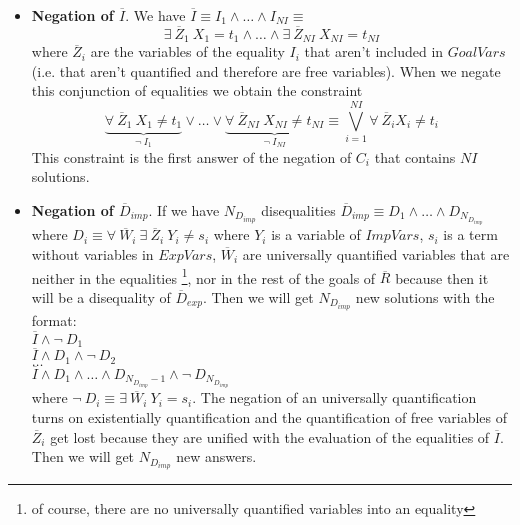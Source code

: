 \documentclass{llncs}
\begin{document}
        \begin{itemize}

           \item {\bf Negation of $\overline{I}$}. We have $\overline{I}
           \equiv I_1 \wedge \ldots \wedge I_{NI} \equiv$ \[ \exists~
           \overline{Z}_1~ X_1 = t_1 \wedge \ldots \wedge \exists~
           \overline{Z}_{NI}~ X_{NI} = t_{NI} \] where
           $\overline{Z}_i$ are the variables of the equality $I_i$ that
           aren't included in $GoalVars$ (i.e. that aren't quantified
           and therefore are free variables). When we negate this
           conjunction of equalities we obtain the constraint 
                \[
           \underbrace{\forall~ \overline{Z}_1~ X_1 \neq t_1} _{\neg~
           I_1} \vee \ldots \vee \underbrace{\forall~
           \overline{Z}_{NI}~ X_{NI} \neq t_{NI} } _{\neg~ I_{NI}}
           \equiv %
           \bigvee_{i=1}^{NI} \forall~ \overline{Z}_i X_i
           \neq t_i \] 
           This constraint is the first answer of the
           negation of $C_i$ that contains $NI$ solutions.

           \item {\bf Negation of $\overline{D}_{imp}$}. If we have
           $N_{D_{imp}}$ disequalities $\overline{D}_{imp} \equiv D_1
           \wedge \ldots \wedge D_{N_{D_{imp}}}$ where $ D_i \equiv
           \forall~ \overline{W}_i ~ \exists~ \overline{Z}_i ~ Y_i
           \neq s_i$ where $Y_i$ is a variable of $ImpVars$, $s_i$ is
           a term without variables in $ExpVars$, $\overline{W}_i$ are
           universally quantified variables that are neither in the
           equalities \footnote{of course, there are no universally
           quantified variables into an equality}, nor in the rest of
           the goals of $\overline{R}$ because then it will be a
           disequality of $\overline{D}_{exp}$. Then we will get
           $N_{D_{imp}}$ new solutions with the format: \\

           $\overline{I} \wedge \neg~ D_1 $ \\ 
           $\overline{I} \wedge
           D_1 \wedge \neg~ D_2 $ \\ 
           $\ldots $ \\ 
           $\overline{I} \wedge
           D_1 \wedge \ldots \wedge D_{N_{D_{imp}}-1} \wedge \neg~
           D_{N_{D_{imp}}}$ \\ 

           where $ \neg~ D_i \equiv \exists~
           \overline{W}_i~ Y_i = s_i$. The negation of an universally
           quantification turns on existentially quantification and
           the quantification of free variables of $\overline{Z}_i$
           get lost because they are unified with the evaluation of
           the equalities of $\overline{I}$. Then we will get
           $N_{D_{imp}}$ new answers.



\end{itemize}
\end{document}
